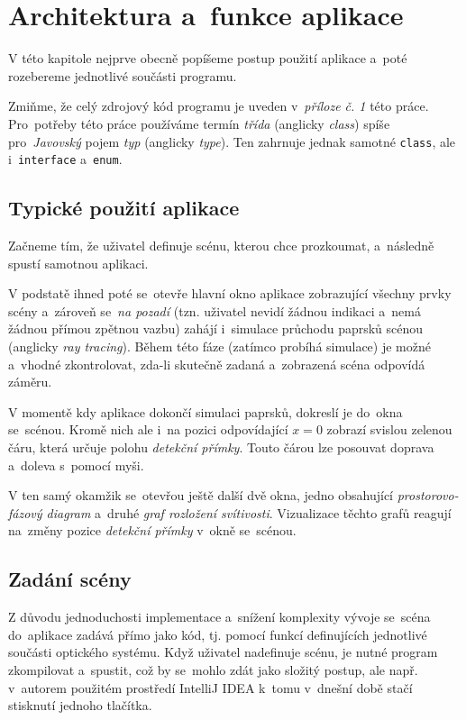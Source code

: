 \section{Architektura a~funkce aplikace}

V této kapitole nejprve obecně popíšeme postup použití aplikace a~poté rozebereme jednotlivé součásti programu.

Zmiňme, že celý zdrojový kód programu je uveden v~\emph{příloze č. 1} této práce. Pro~potřeby této práce používáme termín \emph{třída} (anglicky \emph{class}) spíše pro~\emph{Javovský} pojem \emph{typ} (anglicky \emph{type}). Ten zahrnuje jednak samotné \texttt{class}, ale i~\texttt{interface} a~\texttt{enum}.

\subsection{Typické použití aplikace}

Začneme tím, že uživatel definuje scénu, kterou chce prozkoumat, a~následně spustí samotnou aplikaci.

V podstatě ihned poté se~otevře hlavní okno aplikace zobrazující všechny prvky scény a~zároveň se~\emph{na pozadí} (tzn. uživatel nevidí žádnou indikaci a~nemá žádnou přímou zpětnou vazbu) zahájí i~simulace průchodu paprsků scénou (anglicky \emph{ray tracing}). Během této fáze (zatímco probíhá simulace) je možné a~vhodné zkontrolovat, zda-li skutečně zadaná a~zobrazená scéna odpovídá záměru.

V momentě kdy aplikace dokončí simulaci paprsků, dokreslí je do~okna se~scénou. Kromě nich ale i~na pozici odpovídající $ x = 0 $ zobrazí svislou zelenou čáru, která určuje polohu \emph{detekční přímky}. Touto čárou lze posouvat doprava a~doleva s~pomocí myši.

V ten samý okamžik se~otevřou ještě další dvě okna, jedno obsahující \emph{prostorovo-fázový diagram} a~druhé \emph{graf rozložení svítivosti}. Vizualizace těchto grafů reagují na~změ\-ny pozice \emph{detekční přímky} v~okně se~scénou.

\subsection{Zadání scény}
\label{sub:architekturaaplikace_zadanisceny}

Z důvodu jednoduchosti implementace a~snížení komplexity vývoje se~scéna do~aplikace zadává přímo jako kód, tj. pomocí funkcí definujících jednotlivé součásti optického systému. Když uživatel nadefinuje scénu, je nutné program zkompilovat a~spustit, což by se~mohlo zdát jako složitý postup, ale např. v~autorem použitém prostředí IntelliJ IDEA k~tomu v~dnešní době stačí stisknutí jednoho tlačítka.

